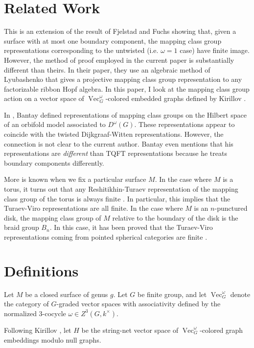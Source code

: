 \documentclass{amsart}
\DeclareMathOperator{\Vect}{Vec}
\begin{document}
\section{Related Work}

This is an extension of the result of Fjelstad and Fuchs \cite{fjfu} showing that, given a surface with at most one boundary component, the mapping class group representations corresponding to the untwisted (i.e. $\omega = 1$ case) have finite image.  However, the method of proof employed in the current paper is substantially different than theirs.  In their paper, they use an algebraic method of Lyubashenko \cite{Lyubashenko1996} that gives a projective mapping class group representation to any factorizable ribbon Hopf algebra.  In this paper, I look at the mapping class group action on a vector space of $\Vect_G^\omega$-colored embedded graphs defined by Kirillov \cite{kirillovStringNets}.

In \cite{bantay}, Bantay defined representations of mapping class groups on the Hilbert space of an orbifold model associated to $D^\omega(G)$.  These representations appear to coincide with the twisted Dijkgraaf-Witten representations. However, the connection is not clear to the current author.  Bantay even mentions that his representations are \emph{different} than TQFT representations because he treats boundary components differently.  

More is known when we fix a particular surface $M$. In the case where $M$ is a torus, it turns out that any Reshitikhin-Turaev representation of the mapping class group of the torus is always finite \cite{0806.2493}.  In particular, this implies that the Turaev-Viro representations are all finite.  In the case where $M$ is an $n$-punctured disk, the mapping class group of $M$ relative to the boundary of the disk is the braid group $B_n$.  In this case, it has been proved that the Turaev-Viro representations coming from pointed spherical categories are finite \cite{erw}.

\section{Definitions}

Let $M$ be a closed surface of genus $g$.  Let $G$ be finite group, and let $\Vect_G^\omega$ denote the category of $G$-graded vector spaces with associativity defined by the normalized 3-cocycle $\omega \in Z^3(G, k^\times)$. 

Following Kirillov \cite{kirillovStringNets}, let $H$ be the string-net vector space of $\Vect_G^\omega$-colored graph embeddings modulo null graphs. 
\end{document}
